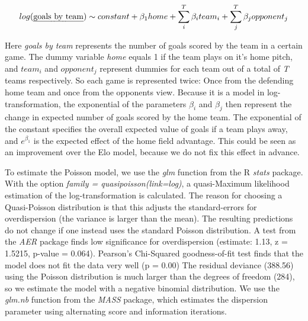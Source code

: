 \documentclass[12pt,a4paper]{article}
\begin{document}
\begin{align}
log(\text{\emph{goals by team}}) \sim constant + \beta_1 home + \sum_{i}^{T} \beta_i team_i + \sum_{j}^{T} \beta_j opponent_j
\end{align}

Here \emph{goals by team} represents the number of goals scored by the
team in a certain game. The dummy variable \emph{home} equals 1 if the
team plays on it's home pitch, and \(team_i\) and \(opponent_j\)
represent dummies for each team out of a total of \emph{T} teams
respectively. So each game is represented twice: Once from the defending
home team and once from the opponents view. Because it is a model in
log-transformation, the exponential of the parameters \(\beta_i\) and
\(\beta_j\) then represent the change in expected number of goals scored
by the home team. The exponential of the constant specifies the overall
expected value of goals if a team plays away, and \(e^{\beta_1}\) is the
expected effect of the home field advantage. This could be seen as an
improvement over the Elo model, because we do not fix this effect in
advance.

To estimate the Poisson model, we use the \emph{glm} function from the R
\emph{stats} package. With the option \emph{family =
quasipoisson(link=log)}, a quasi-Maximum likelihood estimation of the
log-transformation is calculated. The reason for choosing a
Quasi-Poisson distribution is that this adjusts the standard-errors for
overdispersion (the variance is larger than the mean). The resulting
predictions do not change if one instead uses the standard Poisson
distribution. A test from the \emph{AER} package finds low significance
for overdispersion (estimate: 1.13, z = 1.5215, p-value = 0.064).
Pearson's Chi-Squared goodness-of-fit test finds that the model does not
fit the data very well (p = 0.00) The residual deviance (388.56) using
the Poisson distribution is much larger than the degrees of freedom
(284), so we estimate the model with a negative binomial distribution.
We use the \emph{glm.nb} function from the \emph{MASS} package, which
estimates the dispersion parameter using alternating score and
information iterations.
\end{document}
